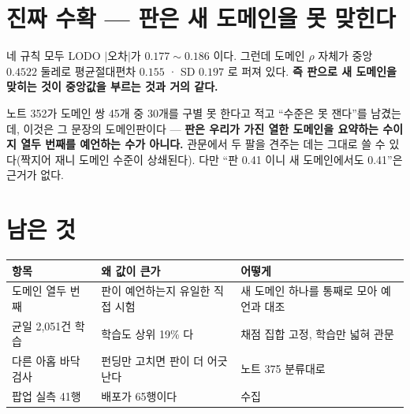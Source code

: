 \documentclass[11pt]{article}
\begin{document}
\section{진짜 수확 --- 판은 새 도메인을 못 맞힌다}

네 규칙 모두 LODO $|$오차$|$가 $0.177 \sim 0.186$ 이다. 그런데 도메인
$\rho$ 자체가 중앙 $0.4522$ 둘레로 평균절대편차 $0.155$ · SD $0.197$ 로
퍼져 있다. \textbf{즉 판으로 새 도메인을 맞히는 것이 중앙값을 부르는 것과
거의 같다.}

노트 352가 도메인 쌍 45개 중 30개를 구별 못 한다고 적고 ``수준은 못
잰다''를 남겼는데, 이것은 그 문장의 도메인판이다 --- \textbf{판은 우리가
가진 열한 도메인을 요약하는 수이지 열두 번째를 예언하는 수가 아니다.}
관문에서 두 팔을 견주는 데는 그대로 쓸 수 있다(짝지어 재니 도메인 수준이
상쇄된다). 다만 ``판 0.41 이니 새 도메인에서도 0.41''은 근거가 없다.

\section{남은 것}

\begin{center}
\begin{tabular}{lll}
\hline
항목 & 왜 값이 큰가 & 어떻게 \\
\hline
도메인 열두 번째 & 판이 예언하는지 유일한 직접 시험 & 새 도메인 하나를 통째로 모아 예언과 대조 \\
균일 2,051건 학습 & 학습도 상위 19\% 다 & 채점 집합 고정, 학습만 넓혀 관문 \\
다른 아홉 바닥 검사 & 펀딩만 고치면 판이 더 어긋난다 & 노트 375 분류대로 \\
팝업 실측 41행 & 배포가 65행이다 & 수집 \\
\hline
\end{tabular}
\end{center}
\end{document}
